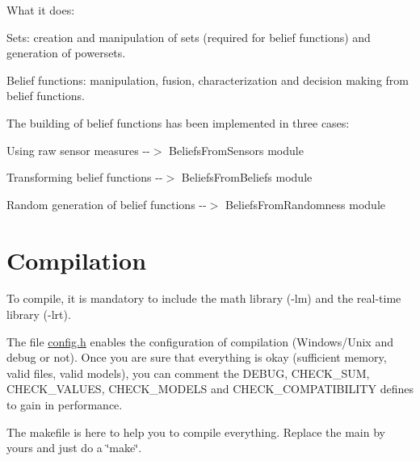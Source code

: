 What it does: \begin{DoxyItemize}
\item Sets: creation and manipulation of sets (required for belief functions) and generation of powersets. \item Belief functions: manipulation, fusion, characterization and decision making from belief functions.\end{DoxyItemize}
The building of belief functions has been implemented in three cases: \begin{DoxyItemize}
\item Using raw sensor measures -\/-\/$>$ BeliefsFromSensors module \item Transforming belief functions -\/-\/$>$ BeliefsFromBeliefs module \item Random generation of belief functions -\/-\/$>$ BeliefsFromRandomness module\end{DoxyItemize}
\hypertarget{index_compil_sec}{}\section{Compilation}\label{index_compil_sec}
To compile, it is mandatory to include the math library (-\/lm) and the real-\/time library (-\/lrt). \par


The file \hyperlink{config_8h}{config.h} enables the configuration of compilation (Windows/Unix and debug or not). Once you are sure that everything is okay (sufficient memory, valid files, valid models), you can comment the DEBUG, CHECK\_\-SUM, CHECK\_\-VALUES, CHECK\_\-MODELS and CHECK\_\-COMPATIBILITY defines to gain in performance.\par
 The makefile is here to help you to compile everything. Replace the main by yours and just do a \char`\"{}make\char`\"{}.

